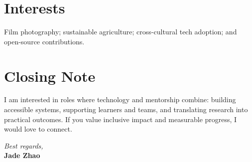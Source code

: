 \documentclass[11pt]{article}
\begin{document}
\section*{Interests}
Film photography; sustainable agriculture; cross-cultural tech adoption; and open-source contributions.

\section*{Closing Note}
I am interested in roles where technology and mentorship combine: building accessible systems, supporting learners and teams, and translating research into practical outcomes. If you value inclusive impact and measurable progress, I would love to connect.

\vspace{0.5em}
\textit{Best regards,}\\
\textbf{Jade Zhao}
\end{document}
